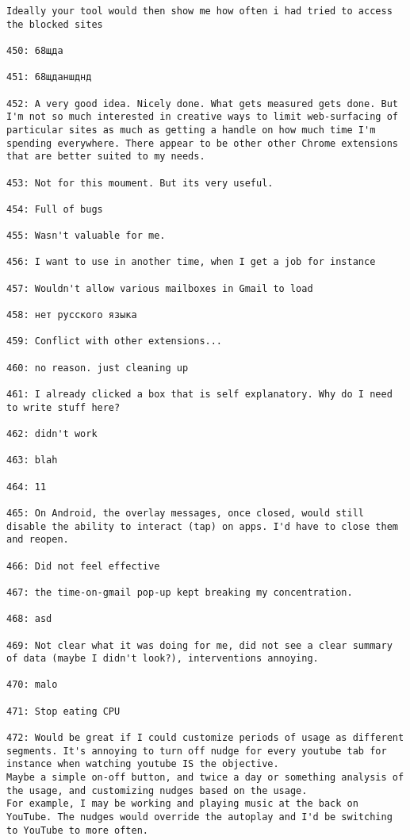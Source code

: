 \begin{lstlisting}[breaklines]
Ideally your tool would then show me how often i had tried to access the blocked sites

450: 68щда

451: 68щданшднд

452: A very good idea. Nicely done. What gets measured gets done. But I'm not so much interested in creative ways to limit web-surfacing of particular sites as much as getting a handle on how much time I'm spending everywhere. There appear to be other other Chrome extensions that are better suited to my needs.

453: Not for this moument. But its very useful.

454: Full of bugs

455: Wasn't valuable for me.

456: I want to use in another time, when I get a job for instance

457: Wouldn't allow various mailboxes in Gmail to load

458: нет русского языка

459: Conflict with other extensions...

460: no reason. just cleaning up

461: I already clicked a box that is self explanatory. Why do I need to write stuff here?

462: didn't work

463: blah

464: 11

465: On Android, the overlay messages, once closed, would still disable the ability to interact (tap) on apps. I'd have to close them and reopen.

466: Did not feel effective

467: the time-on-gmail pop-up kept breaking my concentration.

468: asd

469: Not clear what it was doing for me, did not see a clear summary of data (maybe I didn't look?), interventions annoying.

470: malo

471: Stop eating CPU

472: Would be great if I could customize periods of usage as different segments. It's annoying to turn off nudge for every youtube tab for instance when watching youtube IS the objective.
Maybe a simple on-off button, and twice a day or something analysis of the usage, and customizing nudges based on the usage. 
For example, I may be working and playing music at the back on YouTube. The nudges would override the autoplay and I'd be switching to YouTube to more often.


\end{lstlisting}
